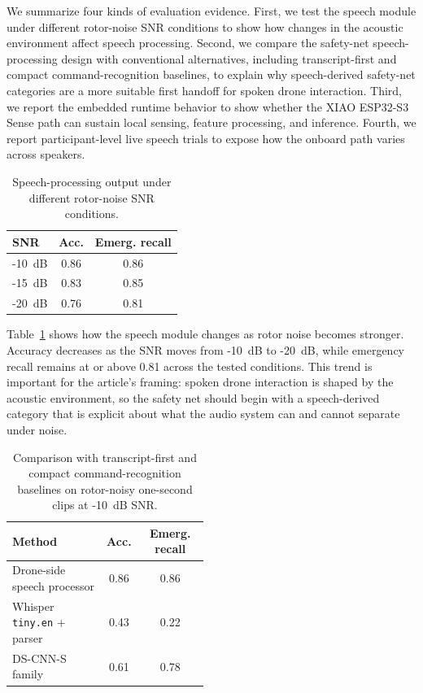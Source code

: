 We summarize four kinds of evaluation evidence. First, we test the speech module under different rotor-noise SNR conditions to show how changes in the acoustic environment affect speech processing. Second, we compare the safety-net speech-processing design with conventional alternatives, including transcript-first and compact command-recognition baselines, to explain why speech-derived safety-net categories are a more suitable first handoff for spoken drone interaction. Third, we report the embedded runtime behavior to show whether the XIAO ESP32-S3 Sense path can sustain local sensing, feature processing, and inference. Fourth, we report participant-level live speech trials to expose how the onboard path varies across speakers.

\begin{table}[t]
    \centering
    \caption{Speech-processing output under different rotor-noise SNR conditions.}
    \label{tab:snr_results}
    \footnotesize
    \setlength{\tabcolsep}{3pt}
    \begin{tabular}{@{}lcc@{}}
        \toprule
        SNR & Acc. & Emerg. recall \\
        \midrule
        -10~dB & 0.86 & 0.86 \\
        -15~dB & 0.83 & 0.85 \\
        -20~dB & 0.76 & 0.81 \\
        \bottomrule
    \end{tabular}
\end{table}

Table~\ref{tab:snr_results} shows how the speech module changes as rotor noise becomes stronger. Accuracy decreases as the SNR moves from -10~dB to -20~dB, while emergency recall remains at or above 0.81 across the tested conditions. This trend is important for the article's framing: spoken drone interaction is shaped by the acoustic environment, so the safety net should begin with a speech-derived category that is explicit about what the audio system can and cannot separate under noise.

\begin{table}[t]
    \centering
    \caption{Comparison with transcript-first and compact command-recognition baselines on rotor-noisy one-second clips at -10~dB SNR.}
    \label{tab:baseline_comparison}
    \footnotesize
    \setlength{\tabcolsep}{3pt}
    \begin{tabular}{@{}p{0.48\linewidth}cc@{}}
        \toprule
        Method & Acc. & Emerg. recall \\
        \midrule
        Drone-side speech processor & 0.86 & 0.86 \\
        Whisper \texttt{tiny.en} + parser & 0.43 & 0.22 \\
        DS-CNN-S family & 0.61 & 0.78 \\
        \bottomrule
    \end{tabular}
\end{table}

